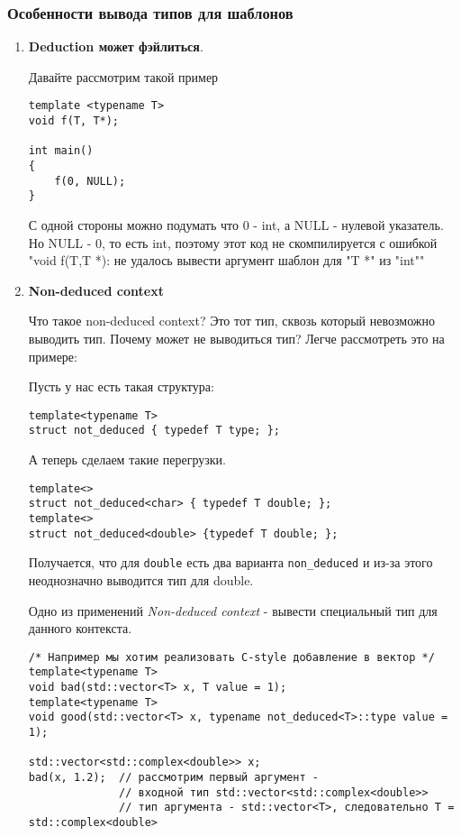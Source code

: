 		\subsubsection{Особенности вывода типов для шаблонов}
			\begin{enumerate}
				\item \textbf{Deduction может фэйлиться}.
				
				Давайте рассмотрим такой пример
\begin{verbatim}
template <typename T>
void f(T, T*);

int main()
{
	f(0, NULL);
}
				\end{verbatim}
				С одной стороны можно подумать что 0 - int, а NULL - нулевой указатель. Но NULL - 0, то есть int, поэтому этот код не скомпилируется с ошибкой "void f(T,T *): не удалось вывести аргумент шаблон для "T *" из "int""
				
				\item \textbf{Non-deduced context}
				
				Что такое non-deduced context? Это тот тип, сквозь который невозможно выводить тип. Почему может не выводиться тип? Легче рассмотреть это на примере:
				
				Пусть у нас есть такая структура:
\begin{verbatim}
template<typename T>
struct not_deduced { typedef T type; };
\end{verbatim}
				А теперь сделаем такие перегрузки.
\begin{verbatim}
template<>
struct not_deduced<char> { typedef T double; };
template<>
struct not_deduced<double> {typedef T double; };
\end{verbatim}
				Получается, что для \texttt{double} есть два варианта \texttt{non_deduced} и из-за этого неоднозначно выводится тип для double. 
				
				Одно из применений \textit{Non-deduced context} - вывести специальный тип для данного контекста.
\begin{verbatim}
/* Например мы хотим реализовать С-style добавление в вектор */
template<typename T>
void bad(std::vector<T> x, T value = 1);
template<typename T>
void good(std::vector<T> x, typename not_deduced<T>::type value = 1);

std::vector<std::complex<double>> x;
bad(x, 1.2);  // рассмотрим первый аргумент -
			  // входной тип std::vector<std::complex<double>>
			  // тип аргумента - std::vector<T>, следовательно T = std::complex<double>


\end{verbatim}
\end{enumerate}
